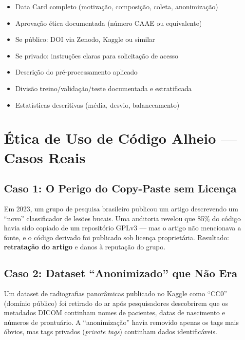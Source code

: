 \begin{itemize}
  \item[\checkmark] Data Card completo (motivação, composição, coleta, anonimização)
  \item[\checkmark] Aprovação ética documentada (número CAAE ou equivalente)
  \item[\checkmark] Se público: DOI via Zenodo, Kaggle ou similar
  \item[\checkmark] Se privado: instruções claras para solicitação de acesso
  \item[\checkmark] Descrição do pré-processamento aplicado
  \item[\checkmark] Divisão treino/validação/teste documentada e estratificada
  \item[\checkmark] Estatísticas descritivas (média, desvio, balanceamento)
\end{itemize}

\section{Ética de Uso de Código Alheio — Casos Reais}

\subsection{Caso 1: O Perigo do Copy-Paste sem Licença}

Em 2023, um grupo de pesquisa brasileiro publicou um artigo descrevendo
um ``novo'' classificador de lesões bucais. Uma auditoria revelou que
85\% do código havia sido copiado de um repositório GPLv3 — mas o artigo
não mencionava a fonte, e o código derivado foi publicado sob licença
proprietária. Resultado: \textbf{retratação do artigo} e danos à
reputação do grupo.

\subsection{Caso 2: Dataset ``Anonimizado'' que Não Era}

Um dataset de radiografias panorâmicas publicado no Kaggle como ``CC0''
(domínio público) foi retirado do ar após pesquisadores descobrirem que
os metadados DICOM continham nomes de pacientes, datas de nascimento e
números de prontuário. A ``anonimização'' havia removido apenas os tags
mais óbvios, mas tags privados (\textit{private tags}) continham dados
identificáveis.


